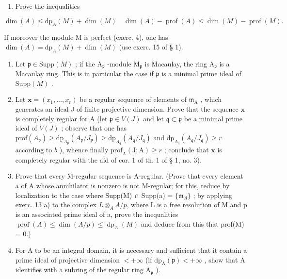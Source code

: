 \begin{enumerate}
\def\labelenumi{\alph{enumi})}
\tightlist
\item
  Prove the inequalities
\end{enumerate}

\[
\dim (A) \leqslant \mathrm{dp} _ {A} (M) + \dim (M) \quad \dim (A) - \operatorname{prof} (A) \leqslant \dim (M) - \operatorname{prof} (M).
\]

If moreover the module M is perfect (exerc. 4), one has \(\dim(A) = \mathrm{dp}_{A}(M) + \dim(M)\) (use exerc. 15 of § 1).

\begin{enumerate}
\def\labelenumi{\alph{enumi})}
\setcounter{enumi}{1}
\item
  Let \(\mathfrak{p} \in \mathrm{Supp}(M)\) ; if the \(\mathrm{A}_{\mathfrak{p}}\) -module \(\mathrm{M}_{\mathfrak{p}}\) is Macaulay, the ring \(\mathrm{A}_{\mathfrak{p}}\) is a Macaulay ring. This is in particular the case if \(\mathfrak{p}\) is a minimal prime ideal of \(\mathrm{Supp}(M)\) .
\item
  Let \(\mathbf{x} = (x_{1},\ldots ,x_{r})\) be a regular sequence of elements of \(\mathfrak{m}_{\mathrm{A}}\) , which generates an ideal J of finite projective dimension. Prove that the sequence \(\mathbf{x}\) is completely regular for A (let \(\mathfrak{p}\in V(J)\) and let \(\mathfrak{q}\subset \mathfrak{p}\) be a minimal prime ideal of \(V(J)\) ; observe that one has \(\mathrm{prof}(A_{\mathfrak{p}})\geqslant \mathrm{dp}_{A_{\mathfrak{p}}}(A_{\mathfrak{p}} / J_{\mathfrak{p}})\geqslant \mathrm{dp}_{A_{\mathfrak{q}}}(A_{\mathfrak{q}} / J_{\mathfrak{q}})\) and \(\mathrm{dp}_{A_{\mathfrak{q}}}(A_{\mathfrak{q}} / J_{\mathfrak{q}})\geqslant r\) according to \(b\) ), whence finally \(\mathrm{prof}_{\mathrm{A}}(\mathrm{J};\mathrm{A})\geqslant r\) ; conclude that \(\mathbf{x}\) is completely regular with the aid of cor. 1 of th. 1 of § 1, no. 3).
\item
  Prove that every M-regular sequence is A-regular. (Prove that every element a of A whose annihilator is nonzero is not M-regular; for this, reduce by localization to the case where Supp(M) ∩ Supp(a) = \(\{\mathfrak{m}_{A}\}\) ; by applying exerc. 13 a) to the complex \(L \otimes_A A/p\), where L is a free resolution of M and p is an associated prime ideal of a, prove the inequalities \(\operatorname{prof}(A) \leqslant \dim(A/p) \leqslant \operatorname{dp}_{A}(M)\) and deduce from this that prof(M) = 0.)
\item
  For A to be an integral domain, it is necessary and sufficient that it contain a prime ideal of projective dimension \(< +\infty\) (if \(\mathrm{dp}_{\mathrm{A}}(\mathfrak{p}) < +\infty\) , show that A identifies with a subring of the regular ring \(\mathrm{A}_{\mathfrak{p}}\) ).
\end{enumerate}

